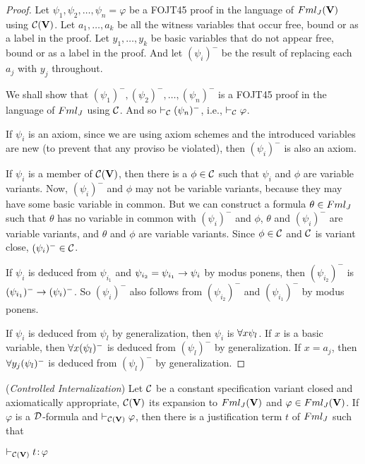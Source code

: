 \begin{proof}
	Let $\psi_{1}, \psi_{2}, \dots , \psi_{n} = \varphi$ be a FOJT45 proof in the language of $Fml_{J}(\textbf{V})$ using $\mathcal{C}(\textbf{V})$. Let $a_{1}, \dots, a_{k}$ be all the witness variables that occur free, bound or as a label in the proof. Let $y_{1}, \dots, y_{k}$ be basic variables that do not appear free, bound or as a label in the proof. And let $(\psi_{i})^{-}$ be the result of replacing each $a_{j}$ with $y_{j}$ throughout.
	
	\qquad We shall show that  $(\psi_{1})^{-}, (\psi_{2})^{-}, \dots , (\psi_{n})^{-}$ is a FOJT45 proof in the language of $Fml_{J}$ using $\mathcal{C}$. And so $\vdash_{\mathcal{C}} (\psi_{n})^{-}$, i.e., $\vdash_{\mathcal{C}} \varphi$.  
	
	\qquad If $\psi_{i}$ is an axiom, since we are using axiom schemes and the introduced variables are new (to prevent that any proviso be violated), then $(\psi_{i})^{-}$ is also an axiom.    
	
	\qquad If $\psi_{i}$ is a member of $\mathcal{C}(\textbf{V})$, then there is a $\phi \in \mathcal{C}$ such that $\psi_{i}$ and $\phi$ are variable variants. Now, $(\psi_{i})^{-}$ and $\phi$ may not be variable variants, because they may have some basic variable in common. But we can construct a formula $\theta \in Fml_{J}$ such that $\theta$ has no variable in common with $(\psi_{i})^{-}$ and $\phi$, $\theta$ and $(\psi_{i})^{-}$ are variable variants, and $\theta$ and $\phi$ are variable variants. Since $\phi \in \mathcal{C}$ and $\mathcal{C}$ is variant close, $(\psi_{i})^{-}\in \mathcal{C}$.    
	
	\qquad If $\psi_{i}$ is deduced from $\psi_{i_1}$ and $\psi_{i_2} = \psi_{i_1}\rightarrow \psi_{i}$ by modus ponens, then $(\psi_{i_2})^{-}$ is $(\psi_{i_1})^{-} \rightarrow (\psi_{i})^{-}$. So $(\psi_{i})^{-}$ also follows from $(\psi_{i_2})^{-}$ and $(\psi_{i_1})^{-}$ by modus ponens. 
	
	
	\qquad If $\psi_{i}$ is deduced from $\psi_{l}$ by generalization, then $\psi_{i}$ is $\forall x \psi_{l}$. If $x$ is a basic variable, then $\forall x (\psi_{l})^{-}$ is deduced from $(\psi_{l})^{-}$ by generalization. If $x = a_{j}$, then $\forall y_{j} (\psi_{l})^{-}$ is deduced from $(\psi_{l})^{-}$ by generalization.    
	
\end{proof}


\begin{pro}
	(\textit{Controlled Internalization}) Let $\mathcal{C}$ be a constant specification variant closed and axiomatically appropriate, $\mathcal{C}(\textbf{V})$ its expansion to $Fml_{J}(\textbf{V})$ and $\varphi \in Fml_{J}(\textbf{V})$. If $\varphi$ is a $\mathcal{D}$-formula and $\vdash_{\mathcal{C}(\textbf{V})} \varphi$, then there is a justification term $t$ of $Fml_{J}$ such that
	
	\begin{center}
		$\vdash_{\mathcal{C}(\textbf{V})} t$$:$$\varphi$
	\end{center}
\end{pro}

